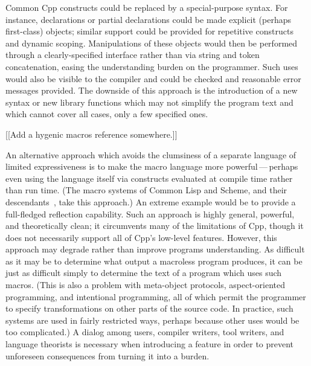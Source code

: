 \documentclass[10pt]{article}
\begin{document}
Common Cpp constructs could be replaced by a special-purpose syntax.  For
instance, declarations or partial declarations could be made explicit
(perhaps first-class) objects; similar support could be provided for
repetitive constructs and dynamic scoping.  Manipulations of these objects
would then be performed through a clearly-specified interface rather than
via string and token concatenation, easing the understanding burden on the
programmer.  Such uses would also be visible to the compiler and could be
checked and reasonable error messages provided.  The downside of this
approach is the introduction of a new syntax or new library functions which
may not simplify the program text and which cannot cover all cases, only a
few specified ones.

[[Add a hygenic macros reference somewhere.]]

An alternative approach which avoids the clumsiness of a separate language
of limited expressiveness is to make the macro language more
powerful\,---\,perhaps even using the language itself via constructs
evaluated at compile time rather than run time.  (The macro systems of
Common Lisp and Scheme, and their descendants~\cite{WeiseC93}, take this
approach.)  An extreme example would be to provide a full-fledged
reflection capability.  Such an approach is highly general, powerful, and
theoretically clean; it circumvents many of the limitations of Cpp,
though it does not necessarily support all of Cpp's low-level features.
However, this approach may degrade rather than improve programs
understanding.  As difficult as it may be to determine what output a
macroless program produces, it can be just as difficult simply to determine
the text of a program which uses such macros.  (This is also a problem with
meta-object protocols, aspect-oriented programming, and intentional
programming, all of which permit the programmer to specify transformations
on other parts of the source code.  In practice, such systems are used in
fairly restricted ways, perhaps because other uses would be too
complicated.)  A dialog among users, compiler writers, tool writers, and
language theorists is necessary when introducing a feature in order to
prevent unforeseen consequences from turning it into a burden.


% 
\end{document}
